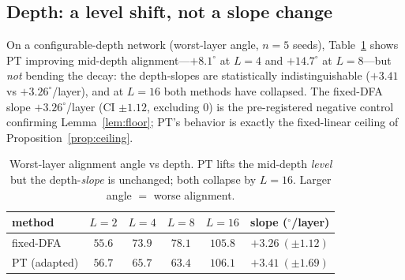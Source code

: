 \documentclass[11pt]{article}
\newcommand{\PT}{\textsc{PT}}
\begin{document}
\subsection{Depth: a level shift, not a slope change}\label{sec:res-depth}
On a configurable-depth network (worst-layer angle, $n=5$ seeds), Table~\ref{tab:depth} shows \PT{} improving mid-depth alignment---$+8.1^{\circ}$ at $L{=}4$ and $+14.7^{\circ}$ at $L{=}8$---but \emph{not} bending the decay: the depth-slopes are statistically indistinguishable ($+3.41$ vs $+3.26^{\circ}$/layer), and at $L{=}16$ both methods have collapsed. The fixed-DFA slope $+3.26^{\circ}$/layer (CI $\pm1.12$, excluding $0$) is the pre-registered negative control confirming Lemma~\ref{lem:floor}; \PT{}'s behavior is exactly the fixed-linear ceiling of Proposition~\ref{prop:ceiling}.
\begin{table}[H]
\centering\footnotesize
\begin{tabular}{@{}lccccc@{}}
\toprule
method & $L{=}2$ & $L{=}4$ & $L{=}8$ & $L{=}16$ & slope ($^{\circ}$/layer) \\
\midrule
fixed-DFA & $55.6$ & $73.9$ & $78.1$ & $105.8$ & $+3.26\ (\pm1.12)$ \\
\PT{} (adapted) & $56.7$ & $65.7$ & $63.4$ & $106.1$ & $+3.41\ (\pm1.69)$ \\
\bottomrule
\end{tabular}
\caption{Worst-layer alignment angle vs depth. \PT{} lifts the mid-depth \emph{level} but the depth-\emph{slope} is unchanged; both collapse by $L{=}16$. Larger angle $=$ worse alignment.}
\label{tab:depth}
\end{table}
\end{document}

